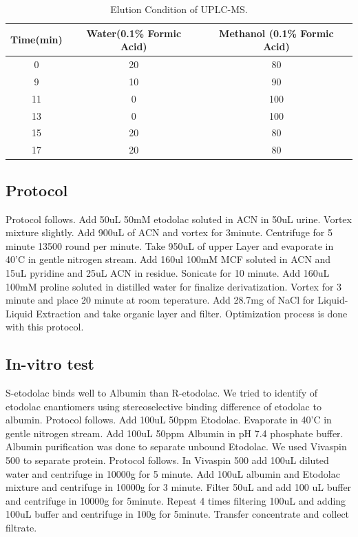 \documentclass[12pt]{article} %
\begin{document}
\begin{table}[h]
  \begin{center}
    \caption{Elution Condition of UPLC-MS.}
    \label{tab:table1}
    \begin{tabular}{ccc}
      \toprule
      Time(min) & Water(0.1\% Formic Acid) & Methanol (0.1\% Formic Acid) \\
      \midrule
      0 & 20 & 80 \\
      \midrule
      9 & 10 & 90 \\
      \midrule
      11 & 0 & 100 \\
      \midrule
      13 & 0 & 100 \\
      \midrule
      15 & 20 & 80 \\
      \midrule
      17 & 20 & 80 \\
      \bottomrule
    \end{tabular}
  \end{center}
\end{table}

\subsection {Protocol}
  Protocol follows. Add 50uL 50mM etodolac soluted in ACN in 50uL urine. Vortex mixture slightly. Add 900uL of ACN and vortex for 3minute. Centrifuge for 5 minute 13500 round per minute. Take 950uL of upper Layer and evaporate in 40'C in gentle nitrogen stream. Add 160ul 100mM MCF soluted in ACN and 15uL pyridine and 25uL ACN in residue. Sonicate for 10 minute. Add 160uL 100mM proline soluted in distilled water for finalize derivatization. Vortex for 3 minute and place 20 minute at room teperature. Add 28.7mg of NaCl for Liquid-Liquid Extraction and take organic layer and filter.
  Optimization process is done with this protocol.


\subsection {In-vitro test}
 S-etodolac binds well to Albumin than R-etodolac.\cite{cite4} We tried to identify of etodolac enantiomers using stereoselective binding difference of etodolac to albumin.
 Protocol follows.  Add 100uL 50ppm Etodolac. Evaporate in 40'C in gentle nitrogen stream. Add 100uL 50ppm Albumin in pH 7.4 phosphate buffer.
 Albumin purification was done to separate unbound Etodolac. We used Vivaspin 500 to separate protein.
 Protocol follows. In Vivaspin 500 add 100uL diluted water and centrifuge in 10000g for 5 minute. Add 100uL albumin and Etodolac mixture and centrifuge in 10000g for 3 minute. Filter 50uL and add 100 uL buffer and centrifuge in 10000g for 5minute. Repeat 4 times filtering 100uL and adding 100uL buffer and centrifuge in 100g for 5minute. Transfer concentrate and collect filtrate.
\end{document}
